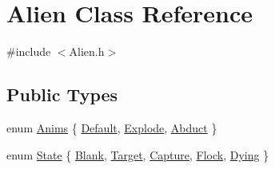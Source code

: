 \hypertarget{class_alien}{}\section{Alien Class Reference}
\label{class_alien}


{\ttfamily \#include $<$Alien.\+h$>$}

\subsection*{Public Types}
\begin{DoxyCompactItemize}
\item 
enum \hyperlink{class_alien_a46333b42b6e6dff962c3236b7012ec8c}{Anims} \{ \hyperlink{class_alien_a46333b42b6e6dff962c3236b7012ec8ca7a4a36a6254d3844899e487586e46337}{Default}, 
\hyperlink{class_alien_a46333b42b6e6dff962c3236b7012ec8ca04a2fe3761bed6d947586432c4747a1c}{Explode}, 
\hyperlink{class_alien_a46333b42b6e6dff962c3236b7012ec8ca44b86fba8c2c960652279d9e807061c4}{Abduct}
 \}
\item 
enum \hyperlink{class_alien_a493c0f699c9ae8b2b714f9c739a2400d}{State} \{ \newline
\hyperlink{class_alien_a493c0f699c9ae8b2b714f9c739a2400da816f7fd79da3c3d0d394fb4e3930f5d8}{Blank}, 
\hyperlink{class_alien_a493c0f699c9ae8b2b714f9c739a2400dafa74abaf987256bdeb9f2df8a69ffd08}{Target}, 
\hyperlink{class_alien_a493c0f699c9ae8b2b714f9c739a2400dae02a372972a7b4862d4840321e663e31}{Capture}, 
\hyperlink{class_alien_a493c0f699c9ae8b2b714f9c739a2400da5f2f5d641e92fc16ce133da2ca32f709}{Flock}, 
\newline
\hyperlink{class_alien_a493c0f699c9ae8b2b714f9c739a2400da90dc39d1c949da5f9fb7703938b99c53}{Dying}
 \}
\end{DoxyCompactItemize}

